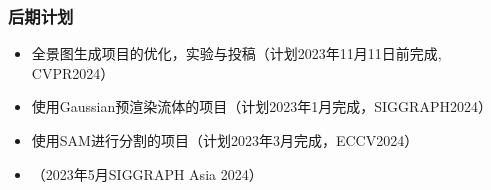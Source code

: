 \begin{frame}
    \frametitle{后期计划}
    \begin{itemize}
        \item 全景图生成项目的优化，实验与投稿（计划2023年11月11日前完成, CVPR2024）
        \item 使用Gaussian预渲染流体的项目（计划2023年1月完成，SIGGRAPH2024）
        \item 使用SAM进行分割的项目（计划2023年3月完成，ECCV2024）
        \item （2023年5月SIGGRAPH Asia 2024）
    \end{itemize}
\end{frame}